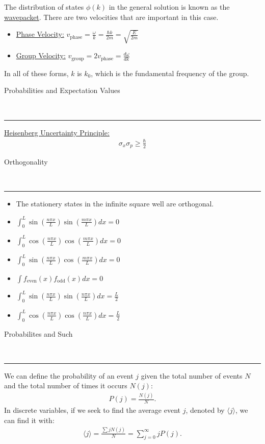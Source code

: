 \documentclass{article}
\newcommand{\header}[1]{\begin{large}\noindent #1\end{large}\\\rule{\textwidth}{0.5pt}}
\newcommand{\gap}{\medskip\\}
\newcommand{\sheader}[1]{\underline{#1:}}
\newcommand{\ds}{\displaystyle}
\begin{document}
    The distribution of states $\phi(k)$ in the general solution is known 
    as the \underline{wavepacket}. There are two velocities that are important
    in this case.
    \begin{itemize}
        \item \sheader{Phase Velocity} $\ds v_\textrm{phase} = \frac{\omega}{k} = \frac{\hbar k}{2m} = \sqrt{\frac{E}{2m}}$
        \item \sheader{Group Velocity} $\ds v_\textrm{group} = 2v_\textrm{phase} = \frac{d\omega}{dk}$
    \end{itemize}
    In all of these forms, $k$ is $k_0$, which is the fundamental 
    frequency of the group.
    \gap

    \header{Probabilities and Expectation Values}
    \sheader{Heisenberg Uncertainty Principle}
    \begin{align*}
        \sigma_x \sigma_p \geq \frac{\hbar}{2}
    \end{align*}

    \header{Orthogonality}

    \begin{itemize}
        \item The stationery states in the infinite square well are orthogonal.
        \item $\ds \int_{0}^{L} \sin \left(\frac{n\pi x}{L}\right) \sin \left(\frac{m\pi x}{L}\right) dx = 0 $
        \item $\ds \int_{0}^{L} \cos \left(\frac{n \pi x}{L}\right) \cos \left(\frac{m \pi x}{L}\right) dx = 0$
        \item $\ds \int_{0}^{L} \sin \left(\frac{n \pi x}{L}\right) \cos \left(\frac{m \pi x}{L}\right) dx = 0$
        \item $\ds \int f_\textrm{even}(x) f_\textrm{odd}(x) dx = 0$
        \item $\ds \int_{0}^{L} \sin \left(\frac{n\pi x}{L}\right) \sin \left(\frac{n\pi x}{L}\right) dx = \frac{L}{2}$
        \item $\ds \int_{0}^{L} \cos \left(\frac{n\pi x}{L}\right) \cos \left(\frac{n\pi x}{L}\right) dx = \frac{L}{2}$
    \end{itemize}

    \header{Probabilites and Such}

    We can define the probability of an event $j$ given the total number of 
    events $N$ and the total number of times it occurs $N(j)$:
    \begin{align*}
        P(j) = \frac{N(j)}{N}.
    \end{align*}
    In discrete variables, if we seek to find the average event $j$, denoted by
    $\langle j \rangle$, we can find it with:
    \begin{align*}
        \langle j \rangle = \frac{\sum j N(j)}{N} = \sum_{j = 0}^\infty j P(j).
    \end{align*}
\end{document}
